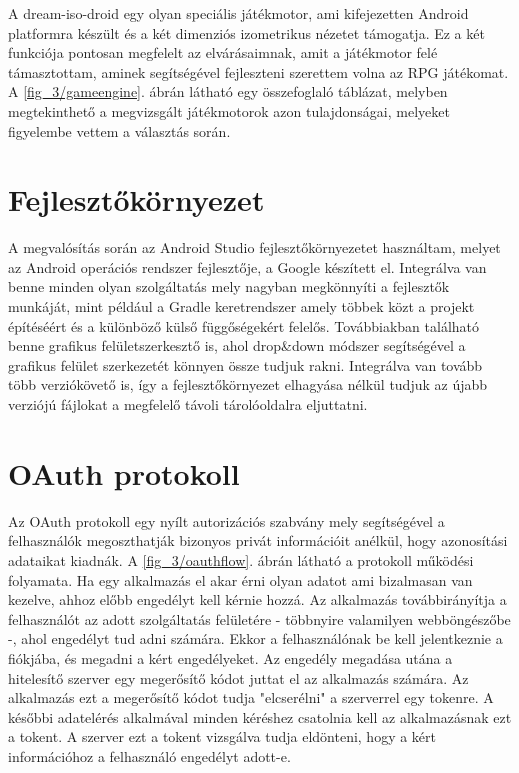 
A dream-iso-droid egy olyan speciális játékmotor, ami kifejezetten Android platformra készült és a két dimenziós izometrikus nézetet támogatja. 
Ez a két funkciója pontosan megfelelt az elvárásaimnak, amit a játékmotor felé támasztottam, aminek segítségével fejleszteni szerettem volna az RPG játékomat.
A \ref{fig_3/gameengine}. ábrán látható egy összefoglaló táblázat, melyben megtekinthető a megvizsgált játékmotorok azon tulajdonságai, melyeket figyelembe vettem a választás során. 

\section*{Fejlesztőkörnyezet}
\label{ide}

A megvalósítás során az Android Studio fejlesztőkörnyezetet használtam, melyet az Android operációs rendszer fejlesztője, a Google készített el. 
Integrálva van benne minden olyan szolgáltatás mely nagyban megkönnyíti a fejlesztők munkáját, mint például a Gradle keretrendszer amely többek közt a projekt építéséért és a különböző külső függőségekért felelős. 
Továbbiakban található benne grafikus felületszerkesztő is, ahol drop\&down módszer segítségével a grafikus felület szerkezetét könnyen össze tudjuk rakni. 
Integrálva van tovább több verziókövető is, így a fejlesztőkörnyezet elhagyása nélkül tudjuk az újabb verziójú fájlokat a megfelelő távoli tárolóoldalra eljuttatni. 

\section*{OAuth protokoll}
\label{oauth}


Az OAuth protokoll \cite{oauthprotocol} egy nyílt autorizációs szabvány mely segítségével a felhasználók megoszthatják bizonyos privát információit anélkül, hogy azonosítási adataikat kiadnák. 
A \ref{fig_3/oauthflow}. ábrán látható a protokoll működési folyamata. 
Ha egy alkalmazás el akar érni olyan adatot ami bizalmasan van kezelve, ahhoz előbb engedélyt kell kérnie hozzá. 
Az alkalmazás továbbirányítja a felhasználót az adott szolgáltatás felületére - többnyire valamilyen webböngészőbe -, ahol engedélyt tud adni számára. 
Ekkor a felhasználónak be kell jelentkeznie a fiókjába, és megadni a kért engedélyeket. 
Az engedély megadása utána a hitelesítő szerver egy megerősítő kódot juttat el az alkalmazás számára. 
Az alkalmazás ezt a megerősítő kódot tudja "elcserélni" a szerverrel egy tokenre. 
A későbbi adatelérés alkalmával minden kéréshez csatolnia kell az alkalmazásnak ezt a tokent. 
A szerver ezt a tokent vizsgálva tudja eldönteni, hogy a kért információhoz a felhasználó engedélyt adott-e. 
